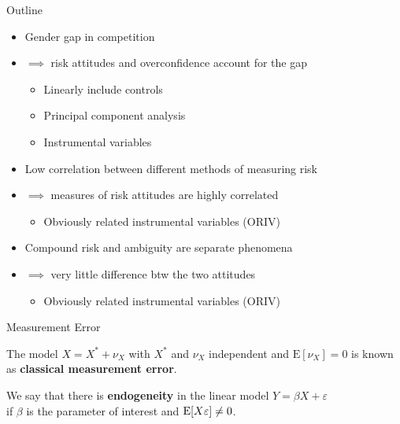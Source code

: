 \begin{frame}{Outline}
    \begin{itemize}
        \item Gender gap in competition \citep{niederle2007women}
        \item[]<2-> {\color{blue}$\implies$ risk attitudes and overconfidence account for the gap}
        \begin{itemize}
            \item \color{blue}Linearly include controls
            \item \color{blue}Principal component analysis
            \item \color{blue}Instrumental variables
        \end{itemize}
        \item Low correlation between different methods of measuring risk \citep{friedman2014risky}
        \item[]<3-> {\color{blue}$\implies$ measures of risk attitudes are highly correlated}
        \begin{itemize}
            \item \color{blue}Obviously related instrumental variables (ORIV)
        \end{itemize}
        \item Compound risk and ambiguity are separate phenomena \citep{halevy2007ellsberg, epstein2010paradox, ahn2014estimating}
        \item[]<4-> {\color{blue}$\implies$ very little difference btw the two attitudes}
        \begin{itemize}
            \item \color{blue}Obviously related instrumental variables (ORIV)
        \end{itemize}
    \end{itemize}
\end{frame}

\begin{frame}{Measurement Error}
    \begin{definition}
        The model $X = X^{*} + \nu_{X}$ with $X^{*}$ and $\nu_{X}$ independent and $\mathrm{E}[\nu_{X}]=0$ is known as \textbf{classical measurement error}.
    \end{definition}
    \vspace{3mm}
    \begin{definition}
        We say that there is \textbf{endogeneity} in the linear model $Y=\beta X + \varepsilon$
        \\if $\beta$ is the parameter of interest and $\mathrm{E}[X \varepsilon] \neq 0$.
    \end{definition}
\end{frame}

